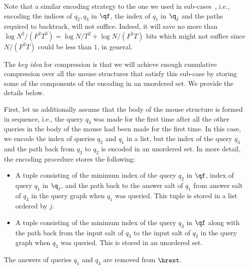 {\begin{remark}
Note that a similar encoding strategy to the one we used in sub-cases~, i.e., encoding the indices of $q_2,q_3$ in $\qf$, the index of $q_1$ in $\q_j$ and the paths required to backtrack,  will not suffice. Indeed, it will save no more than $\log N^2/(F^2T^3)=\log N/T^2+\log N/(F^2T)$ bits which might not suffice since $N/(F^2T)$ could be less than $1$, in general.
\end{remark}

The \emph{key idea} for compression is that we will achieve enough cumulative compression over all the mouse structures that satisfy this sub-case by storing some of the components of the encoding in an unordered set. We provide the details below.

First, let us additionally assume that the body of the mouse structure is formed in sequence, i.e., the query $q_3$ was made for the first time after all the other queries in the body of the mouse had been made for the first time. 
In this case, we encode the index of queries $q_2$ and $q_1$ in a list, but the index of the query $q_3$ and the path back from $q_3$ to $q_2$ is encoded in an unordered set. In more detail, the encoding procedure stores the following:
\begin{itemize}
  \item A tuple consisting of the minimum index of the query $q_2$ in $\qf$, index of query $q_1$ in $\q_j$, and the path back to the answer salt of $q_1$ from answer salt of $q_3$ in the query graph when $q_1$ was queried. This tuple is stored in a list ordered by $j$.
  \item A tuple consisting of the minimum index of the query $q_3$ in $\qf$ along with the path back from the input salt of $q_3$ to the input salt of $q_2$ in the query graph when $q_3$ was queried. This is stored in an unordered set.
\end{itemize}
The answers of queries $q_1$ and $q_3$ are removed from $\hrest$.

}
